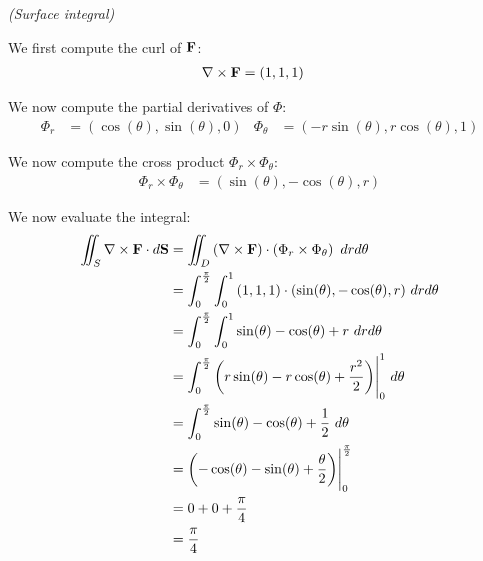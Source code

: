 \begin{solution}
    \textit{(Surface integral)}
    
    We first compute the curl of \(\vb{F}\):
    \begin{align*}
        \nabla \times \vb{F} &= (1, 1, 1)
    \end{align*}
    
    We now compute the partial derivatives of \(\Phi\):
    \begin{align*}
        \Phi_r &= (\cos(\theta), \sin(\theta), 0) & \Phi_\theta &= (-r \sin(\theta), r\cos(\theta), 1)
    \end{align*}
    
    We now compute the cross product \(\Phi_r \times \Phi_\theta\):
    \begin{align*}
        \Phi_r \times \Phi_\theta &= (\sin(\theta), -\cos(\theta), r)
    \end{align*}
    
    We now evaluate the integral:
    \begin{align*}
        \iint_S \nabla \times \vb{F} \cdot d\vb{S} &= \iint_D \left(\nabla \times \vb{F}\right) \cdot \left(\Phi_r \times \Phi_\theta\right) \ dr d\theta \\
        &= \int_0^{\frac{\pi}{2}} \int_0^1 \left(1, 1, 1\right) \cdot (\sin(\theta), -\cos(\theta), r) \ dr d\theta \\
        &= \int_0^{\frac{\pi}{2}} \int_0^1 \sin(\theta) - \cos(\theta) + r \ dr d\theta \\
        &= \int_0^{\frac{\pi}{2}} \left(r\sin(\theta) - r\cos(\theta) + \frac{r^2}{2}\right) \Biggr|_0^1 \ d\theta \\
        &= \int_0^{\frac{\pi}{2}} \sin(\theta) - \cos(\theta) + \frac{1}{2} \ d\theta \\
        &= \left( -\cos(\theta) - \sin(\theta) + \frac{\theta}{2}\right) \Biggr|_0^{\frac{\pi}{2}} \\
        &= 0 + 0 + \frac{\pi}{4} \\
        &= \frac{\pi}{4}
    \end{align*}
\end{solution}

